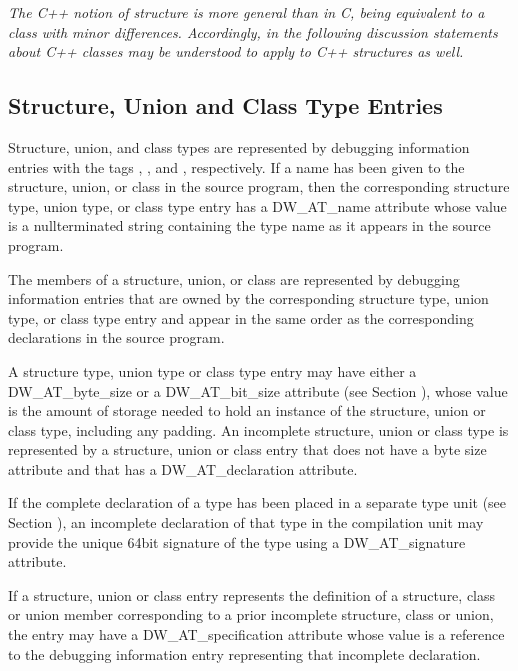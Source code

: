 \textit{The C++ notion of structure is more general than in C, being
equivalent to a class with minor differences. Accordingly,
in the following discussion statements about C++ classes may
be understood to apply to C++ structures as well.}

\subsection{Structure, Union and Class Type Entries}
\label{chap:structureunionandclasstypeentries}


Structure, union, and class types are represented by debugging
information entries with 
the tags ,
, 
and ,
respectively. If a name has been given to the structure,
union, or class in the source program, then the corresponding
structure type, union type, or class type entry has a
DW\_AT\_name attribute whose value is a null\dash terminated string
containing the type name as it appears in the source program.

The members of a structure, union, or class are represented
by debugging information entries that are owned by the
corresponding structure type, union type, or class type entry
and appear in the same order as the corresponding declarations
in the source program.

A structure type, union type or class type entry may have
either a DW\_AT\_byte\_size or a DW\_AT\_bit\_size attribute 
(see Section ), 
whose value is the amount of storage needed
to hold an instance of the structure, union or class type,
including any padding.  An incomplete structure, union or
class type is represented by a structure, union or class
entry that does not have a byte size attribute and that has
a DW\_AT\_declaration attribute.

If the complete declaration of a type has been placed in
a separate type unit 
(see Section ), 
an incomplete
declaration of that type in the compilation unit may provide
the unique 64\dash bit signature of the type using a DW\_AT\_signature
attribute.

If a structure, union or class entry represents the definition
of a structure, class or union member corresponding to a prior
incomplete structure, class or union, the entry may have a
DW\_AT\_specification attribute whose value is a reference to
the debugging information entry representing that incomplete
declaration.

